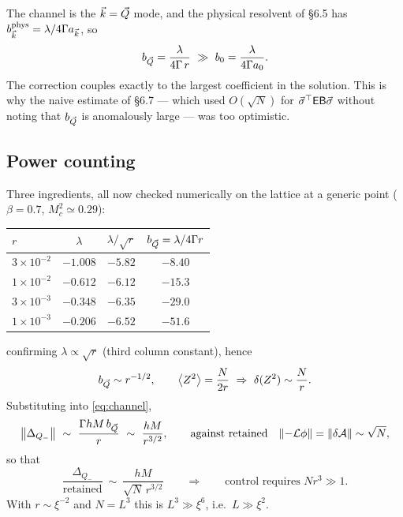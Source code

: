  The channel is the $\vec k=\vec Q$ mode, and the physical resolvent
of \S6.5 has $b^{\rm phys}_{\vec k}=\lambda/4\Gamma a_{\vec k}$, so
\begin{equation}
  b_{\bQ}=\frac{\lambda}{4\Gamma\,r}\ \gg\ b_0=\frac{\lambda}{4\Gamma a_0} .
\end{equation}
The correction couples exactly to the largest coefficient in the solution. This is why the
naive estimate of \S6.7 --- which used $O(\sqrt N)$ for $\vec\sigma^\top\mathsf{E}\mathsf B\vec\sigma$ without
noting that $b_{\vec Q}$ is anomalously large --- was too optimistic.

\subsection{Power counting}
Three ingredients, all now checked numerically on the lattice at a generic point
($\beta=0.7$, $M_c^{2}\simeq0.29$):
\begin{center}
\begin{tabular}{lccc}
\hline
$r$ & $\lambda$ & $\lambda/\sqrt r$ & $b_{\vec Q}=\lambda/4\Gamma r$\\
\hline
$3\times10^{-2}$ & $-1.008$ & $-5.82$ & $-8.40$\\
$1\times10^{-2}$ & $-0.612$ & $-6.12$ & $-15.3$\\
$3\times10^{-3}$ & $-0.348$ & $-6.35$ & $-29.0$\\
$1\times10^{-3}$ & $-0.206$ & $-6.52$ & $-51.6$\\
\hline
\end{tabular}
\end{center}
confirming $\lambda\propto\sqrt r$ (third column constant), hence
\begin{equation}
  b_{\vec Q}\sim r^{-1/2},
  \qquad
  \left\langle Z^{2} \right\rangle=\frac{N}{2r}\ \Rightarrow\ \delta(Z^{2})\sim\frac{N}{r} .
\end{equation}
Substituting into \eqref{eq:channel},
\begin{equation}
  \big\|\Delta_{Q_-}\big\|\ \sim\ \frac{\Gamma h M\,b_{\vec Q}}{r}\ \sim\ \frac{hM}{r^{3/2}},
  \qquad\text{against retained}\quad \|{-}\mathcal{L}\phi\|=\|\delta\mathcal{A}\|\sim\sqrt N ,
\end{equation}
so that
\begin{equation}
  \boxed{\ \frac{\Delta_{Q_-}}{\text{retained}}\ \sim\ \frac{hM}{\sqrt N\,r^{3/2}}
  \qquad\Longrightarrow\qquad
  \text{control requires } N r^{3}\gg1 .\ }
  \label{eq:window}
\end{equation}
With $r\sim\xi^{-2}$ and $N=L^{3}$ this is $L^{3}\gg\xi^{6}$, i.e.\ $L\gg\xi^{2}$.

